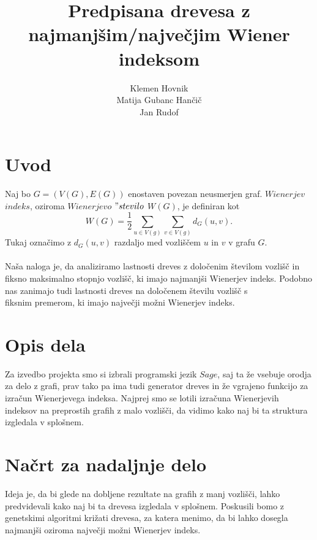 \documentclass[a4paper]{article}
\title{Predpisana drevesa z najmanjšim/največjim Wiener indeksom}
\author{Klemen Hovnik\\ Matija Gubanc Hančič \\ Jan Rudof}
\begin{document}
\maketitle

\section{Uvod}

Naj bo $G=(V(G),  E(G))$ enostaven povezan neusmerjen graf. $Wienerjev$ $ indeks$, oziroma $Wienerjevo$  $"stevilo$ $ W(G)$, je definiran kot
\begin{equation}
W(G) = \frac{1}{2}\sum_{u\in V(g)}\sum_{v\in V(g)} d_G(u,v).
\end{equation}
Tukaj označimo z $d_G(u,v)$ razdaljo med vozliščem $u$ in $v$ v grafu $G$. \\
\\
Naša naloga je, da analiziramo lastnosti dreves z določenim številom vozlišč in 
fiksno maksimalno stopnjo vozlišč, ki imajo najmanjši Wienerjev indeks. Podobno nas zanimajo tudi lastnosti dreves na določenem številu vozlišč s \\
fiksnim premerom, ki imajo največji možni Wienerjev indeks.

\section{Opis dela}

Za izvedbo projekta smo si izbrali programski jezik $Sage$, saj ta že vsebuje orodja za delo z grafi, prav tako pa ima tudi generator dreves 
in že vgrajeno funkcijo za izračun Wienerjevega indeksa. Najprej smo se lotili izračuna Wienerjevih indeksov na preprostih grafih z malo vozlišči, 
da vidimo kako naj bi ta struktura izgledala v splošnem.

\section{Načrt za nadaljnje delo}

Ideja je, da bi glede na dobljene rezultate na grafih z manj vozlišči, lahko predvidevali kako naj bi ta drevesa izgledala v splošnem.
Poskusili bomo z genetskimi algoritmi križati drevesa, za katera menimo, da bi lahko dosegla najmanjši oziroma največji možni
Wienerjev indeks.
\end{document}
